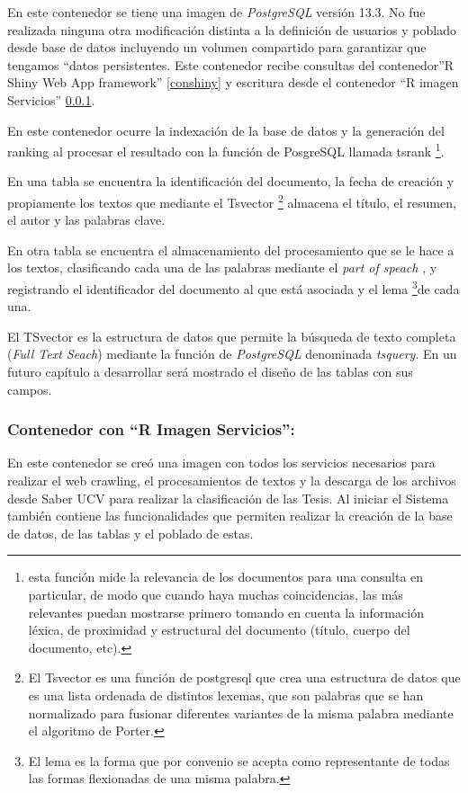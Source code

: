 \documentclass[
  10,
  openany]{book}
\begin{document}
En este contenedor se tiene una imagen de \emph{PostgreSQL} versión 13.3. No fue realizada ninguna otra modificación distinta a la definición de usuarios y poblado desde base de datos incluyendo un volumen compartido para garantizar que tengamos ``datos persistentes. Este contenedor recibe consultas del contenedor''R Shiny Web App framework'' \ref{conshiny} y escritura desde el contenedor ``R imagen Servicios'' \ref{conservicios}.

En este contenedor ocurre la indexación de la base de datos y la generación del ranking al procesar el resultado con la función de PosgreSQL llamada tsrank \footnote{esta función mide la relevancia de los documentos para una consulta en particular, de modo que cuando haya muchas coincidencias, las más relevantes puedan mostrarse primero tomando en cuenta la información léxica, de proximidad y estructural del documento (título, cuerpo del documento, etc).}.

En una tabla se encuentra la identificación del documento, la fecha de creación y propiamente los textos que mediante el Tsvector \footnote{El Tsvector es una función de postgresql que crea una estructura de datos que es una lista ordenada de distintos lexemas, que son palabras que se han normalizado para fusionar diferentes variantes de la misma palabra mediante el algoritmo de Porter.} almacena el título, el resumen, el autor y las palabras clave.

En otra tabla se encuentra el almacenamiento del procesamiento que se le hace a los textos, clasificando cada una de las palabras mediante el \emph{part of speach} , y registrando el identificador del documento al que está asociada y el lema \footnote{El lema es la forma que por convenio se acepta como representante de todas las formas flexionadas de una misma palabra.}de cada una.

El TSvector es la estructura de datos que permite la búsqueda de texto completa (\emph{Full Text Seach}) mediante la función de \emph{PostgreSQL} denominada \emph{tsquery}. En un futuro capítulo a desarrollar será mostrado el diseño de las tablas con sus campos.

\hypertarget{conservicios}{%
\subsubsection{Contenedor con ``R Imagen Servicios'':}\label{conservicios}}

En este contenedor se creó una imagen con todos los servicios necesarios para realizar el web crawling, el procesamientos de textos y la descarga de los archivos desde Saber UCV para realizar la clasificación de las Tesis. Al iniciar el Sistema también contiene las funcionalidades que permiten realizar la creación de la base de datos, de las tablas y el poblado de estas.
\end{document}
